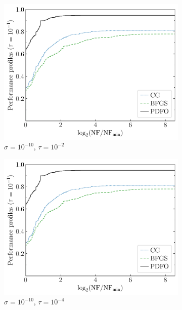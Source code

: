 \documentclass[
    smallextended,  %
    final,          %
]{svjour3}
\begin{document}
\begin{figure}[htbp]
\begin{subfigure}{.48\textwidth}
        \centering
        \includegraphics[width=\textwidth,page=2]{perf-noisy-bfgs_cg_pdfo-50-10.pdf}
        \caption{$\sigma = 10^{-10}$, $\tau = 10^{-2}$}
    \end{subfigure}
    \hfill
    \begin{subfigure}{.48\textwidth}
        \centering
        \includegraphics[width=\textwidth,page=4]{perf-noisy-bfgs_cg_pdfo-50-10.pdf}
        \caption{$\sigma = 10^{-10}$, $\tau = 10^{-4}$}
    \end{subfigure}
    \hfill
    \begin{subfigure}{.48\textwidth}
        \centering

\end{subfigure}
\end{figure}
\end{document}
